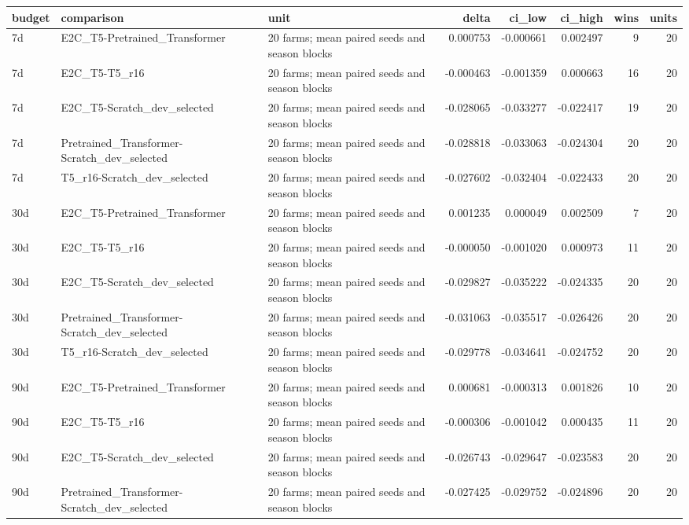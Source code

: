 \begin{tabular}{lllrrrrr}
\toprule
budget & comparison & unit & delta & ci\_low & ci\_high & wins & units \\
\midrule
7d & E2C\_T5-Pretrained\_Transformer & 20 farms; mean paired seeds and season blocks & 0.000753 & -0.000661 & 0.002497 & 9 & 20 \\
7d & E2C\_T5-T5\_r16 & 20 farms; mean paired seeds and season blocks & -0.000463 & -0.001359 & 0.000663 & 16 & 20 \\
7d & E2C\_T5-Scratch\_dev\_selected & 20 farms; mean paired seeds and season blocks & -0.028065 & -0.033277 & -0.022417 & 19 & 20 \\
7d & Pretrained\_Transformer-Scratch\_dev\_selected & 20 farms; mean paired seeds and season blocks & -0.028818 & -0.033063 & -0.024304 & 20 & 20 \\
7d & T5\_r16-Scratch\_dev\_selected & 20 farms; mean paired seeds and season blocks & -0.027602 & -0.032404 & -0.022433 & 20 & 20 \\
30d & E2C\_T5-Pretrained\_Transformer & 20 farms; mean paired seeds and season blocks & 0.001235 & 0.000049 & 0.002509 & 7 & 20 \\
30d & E2C\_T5-T5\_r16 & 20 farms; mean paired seeds and season blocks & -0.000050 & -0.001020 & 0.000973 & 11 & 20 \\
30d & E2C\_T5-Scratch\_dev\_selected & 20 farms; mean paired seeds and season blocks & -0.029827 & -0.035222 & -0.024335 & 20 & 20 \\
30d & Pretrained\_Transformer-Scratch\_dev\_selected & 20 farms; mean paired seeds and season blocks & -0.031063 & -0.035517 & -0.026426 & 20 & 20 \\
30d & T5\_r16-Scratch\_dev\_selected & 20 farms; mean paired seeds and season blocks & -0.029778 & -0.034641 & -0.024752 & 20 & 20 \\
90d & E2C\_T5-Pretrained\_Transformer & 20 farms; mean paired seeds and season blocks & 0.000681 & -0.000313 & 0.001826 & 10 & 20 \\
90d & E2C\_T5-T5\_r16 & 20 farms; mean paired seeds and season blocks & -0.000306 & -0.001042 & 0.000435 & 11 & 20 \\
90d & E2C\_T5-Scratch\_dev\_selected & 20 farms; mean paired seeds and season blocks & -0.026743 & -0.029647 & -0.023583 & 20 & 20 \\
90d & Pretrained\_Transformer-Scratch\_dev\_selected & 20 farms; mean paired seeds and season blocks & -0.027425 & -0.029752 & -0.024896 & 20 & 20 \\

\end{tabular}

